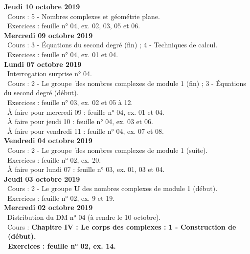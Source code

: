 \documentclass[12pt,a4paper]{article}
\begin{document}
 \noindent\textbf{Jeudi 10 octobre 2019}\\
 \bu\ Cours : 5 - Nombres complexes et géométrie plane.\\
 \bu\ Exercices : feuille n° 04, ex. 02, 03, 05 et 06.\vspace{.4cm}\\
  
\noindent\textbf{\bf Mercredi 09 octobre 2019}\\
\bu\ Cours : 3 - Équations du second degré (fin) ; 4 - Techniques de calcul.\\
 \bu\ Exercices : feuille n° 04, ex. 01 et 04.\vspace{.4cm}\\

\noindent\textbf{\bf Lundi 07 octobre 2019}\\
\bu\ Interrogation surprise n° 04.\\ 
\bu\ Cours : 2 - Le groupe \U\ des nombres complexes de module 1 (fin) ; 3 - Équations du second 
degré (début).\\
\bu\ Exercices : feuille n° 03, ex. 02 et 05 à 12.\\
\bu\ À faire pour mercredi 09 : feuille n° 04, ex. 01 et 04.\\
\bu\ À faire pour jeudi 10 : feuille n° 04, ex. 03 et 06.\\
\bu\ À faire pour vendredi 11 : feuille n° 04, ex. 07 et 08.\vspace{.4cm}\\

\noindent\textbf{Vendredi 04 octobre 2019}\\
\bu\ Cours : 2 - Le groupe \U\ des nombres complexes de module 1 (suite).\\
\bu\ Exercices : feuille n° 02, ex. 20.\\
\bu\ À faire pour lundi 07 : feuille n° 03, ex. 01, 03 et 04.\vspace{.4cm}\\ 

\noindent\textbf{Jeudi 03 octobre 2019}\\
\bu\ Cours : 2 - Le groupe \textbf{U} des nombres complexes de module 1 (début).\\
 \bu\ Exercices : feuille n° 02, ex. 9 et 19.\vspace{.4cm}\\

\noindent\textbf{\bf Mercredi 02 octobre 2019}\\
\bu\ Distribution du DM n° 04 (à rendre le 10 octobre).\\
\bu\ Cours : \bf Chapitre IV \rm : Le corps des complexes : 1 - Construction de \C\ (début).\\
 \bu\ Exercices : feuille n° 02, ex. 14.\vspace{.4cm}\\
\end{document}
